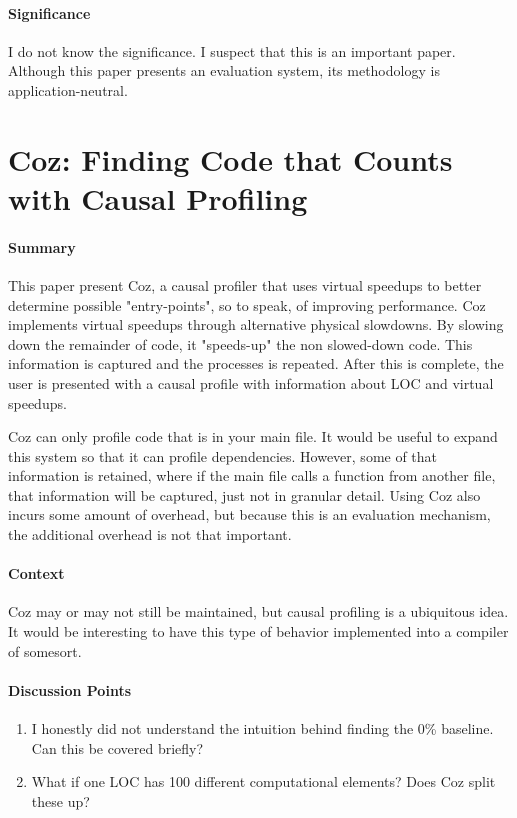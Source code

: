 \paragraph{\textbf{Significance}}
I do not know the significance. I suspect that this is an important paper.
Although this paper presents an evaluation system, its methodology is
application-neutral.

\section {Coz: Finding Code that Counts with Causal Profiling \cite{curtsinger2015c}}

\paragraph{\textbf{Summary}}
This paper present Coz, a causal profiler that uses virtual speedups to better
determine possible "entry-points", so to speak, of improving performance. Coz
implements virtual speedups through alternative physical slowdowns. By slowing
down the remainder of code, it "speeds-up" the non slowed-down code. This
information is captured and the processes is repeated. After this is complete,
the user is presented with a causal profile with information about LOC and
virtual speedups.

Coz can only profile code that is in your main file. It would be useful to
expand this system so that it can profile dependencies. However, some of that
information is retained, where if the main file calls a function from another
file, that information will be captured, just not in granular detail. Using Coz
also incurs some amount of overhead, but because this is an evaluation
mechanism, the additional overhead is not that important.

\paragraph{\textbf{Context}}
Coz may or may not still be maintained, but causal profiling is a ubiquitous
idea. It would be interesting to have this type of behavior implemented into a
compiler of somesort.

\paragraph{\textbf{Discussion Points}}
\begin{enumerate}
    \item I honestly did not understand the intuition behind finding the 0\%
    baseline. Can this be covered briefly?
    \item What if one LOC has 100 different computational elements? Does Coz
    split these up?
\end{enumerate}

